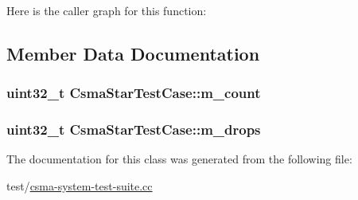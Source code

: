 Here is the caller graph for this function\+:




\subsection{Member Data Documentation}
\subsubsection[{\texorpdfstring{m\+\_\+count}{m_count}}]{\setlength{\rightskip}{0pt plus 5cm}uint32\+\_\+t Csma\+Star\+Test\+Case\+::m\+\_\+count\hspace{0.3cm}{\ttfamily [private]}}\hypertarget{classCsmaStarTestCase_a3b380689a4e0e523c13abbdffde06781}{}\label{classCsmaStarTestCase_a3b380689a4e0e523c13abbdffde06781}
\subsubsection[{\texorpdfstring{m\+\_\+drops}{m_drops}}]{\setlength{\rightskip}{0pt plus 5cm}uint32\+\_\+t Csma\+Star\+Test\+Case\+::m\+\_\+drops\hspace{0.3cm}{\ttfamily [private]}}\hypertarget{classCsmaStarTestCase_ac16da6db1bd8b8670a54805706850e48}{}\label{classCsmaStarTestCase_ac16da6db1bd8b8670a54805706850e48}


The documentation for this class was generated from the following file\+:\begin{DoxyCompactItemize}
\item 
test/\hyperlink{csma-system-test-suite_8cc}{csma-\/system-\/test-\/suite.\+cc}\end{DoxyCompactItemize}
